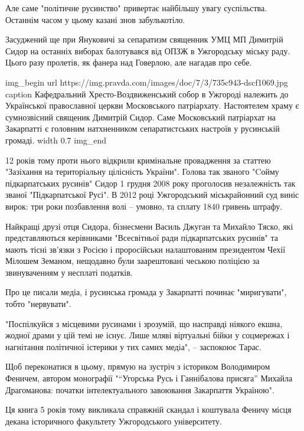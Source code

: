 Але саме "політичне русинство" привертає найбільшу увагу суспільства. Останнім
часом у цьому казані знов забулькотіло.

Засуджений ще при Януковичі за сепаратизм священник УМЦ МП Димитрій Сидор на
останніх виборах балотувався від ОПЗЖ в Ужгородську міську раду. Цього разу
пролетів, як фанера над Говерлою, але нагадав про себе.

\ifcmt
img_begin 
        url https://img.pravda.com/images/doc/7/3/735c943-dscf1069.jpg
        caption Кафедральний Хресто-Воздвиженський собор в Ужгороді належить до Української православної церкви Московського патріархату. Настоятелем храму є сумнозвісний священик Димитрій Сидор. Саме Московський патріархат на Закарпатті є головним натхненником сепаратистських настроїв у русинській громаді.
        width 0.7
img_end
\fi

12 років тому проти нього відкрили кримінальне провадження за статтею
"Зазіхання на територіальну цілісність України". Голова так званого "Cойму
підкарпатських русинів" Сидор 1 грудня 2008 року проголосив незалежність так
званої "Підкарпатської Русі". В 2012 році Ужгородський міськрайонний суд виніс
вирок: три роки позбавлення волі – умовно, та сплату 1840 гривень штрафу.

Найкращі друзі отця Сидора, бізнесмени Василь Джуган та Михайло Тяско, які
представляються керівниками "Всесвітньої ради підкарпатських русинів" та мають
тісні зв'язки з Росією і проросійськи налаштованим президентом Чехії Мілошем
Земаном, нещодавно були заарештовані чеською поліцією за звинуваченням у
несплаті податків.

Про це писали медіа, і русинська громада у Закарпатті починає "миригувати",
тобто "нервувати".

"Поспілкуйся з місцевими русинами і зрозумій, що насправді ніякого екшна,
жодної драми у цій темі не існує. Лише мляві віртуальні бійки у соцмережах і
нагнітання політичної істерики у тих самих медіа", – заспокоює Тарас.

Щоб переконатися в цьому, прямую на зустріч з істориком Володимиром Феничем,
автором монографії "\enquote{Угорська Русь і Ганнібалова присяга} Михайла Драгоманова:
початки інтелектуального завоювання Закарпаття Україною".

Ця книга 5 років тому викликала справжній скандал і коштувала Феничу місця
декана історичного факультету Ужгородського університету. 


